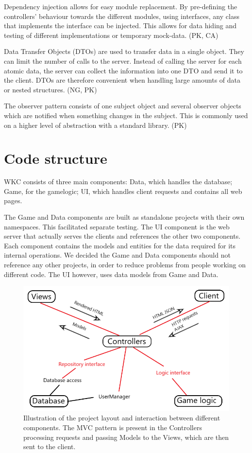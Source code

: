 \documentclass[acmlarge, review=false, screen=true]{acmart}
\begin{document}
Dependency injection allows for easy module replacement\cite{dependency-injection}. By pre-defining the controllers' behaviour towards the different modules, using interfaces, any class that implements the interface can be injected. This allows for data hiding and testing of different implementations or temporary mock-data. (PK, CA)

Data Transfer Objects (DTOs) are used to transfer data in a single object. They can limit the number of calls to the server\cite{DTOs}. Instead of calling the server for each atomic data, the server can collect the information into one DTO and send it to the client. DTOs are therefore convenient when handling large amounts of data or nested structures. (NG, PK)

The observer pattern consists of one subject object and several observer objects which are notified when something changes in the subject\cite{Design-patterns}. This is commonly used on a higher level of abstraction with a standard library. (PK)


\section{Code structure}
WKC consists of three main components: Data, which handles the database; Game, for the gamelogic; UI, which handles client requests and contains all web pages. 

The Game and Data components are built as standalone projects with their own namespaces. This facilitated separate testing. The UI component is the web server that actually serves the clients and references the other two components. Each component contains the models and entities for the data required for its internal operations. We decided the Game and Data components should not reference any other projects, in order to reduce problems from people working on different code. The UI however, uses data models from Game and Data.

\begin{figure}
  \includegraphics[width=\textwidth]{images/image3.png}
  \caption{Illustration of the project layout and interaction between different components. The MVC pattern is present in the Controllers processing requests and passing Models to the Views, which are then sent to the client.
  }
  \label{fig:project-layout}
\end{figure}
\end{document}
